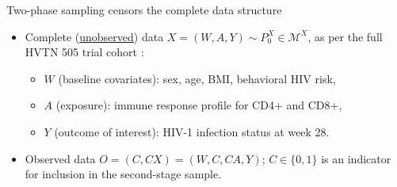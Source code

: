 \documentclass{beamer}
\begin{document}

\begin{frame}[c]{Two-phase sampling censors the complete data structure}

\begin{center}
\begin{itemize}
  \itemsep10pt
  \item Complete (\underline{unobserved}) data $X = (W, A, Y) \sim P_0^X \in
    \mathcal{M}^X$, as per the full HVTN 505 trial cohort
    \citep{hammer2013efficacy}:
    \vspace{1em}
    \begin{itemize}
      \itemsep8pt
      \item $W$ (baseline covariates): sex, age, BMI, behavioral HIV risk,
      \item $A$ (exposure): immune response profile for CD4+ and CD8+,
      \item $Y$ (outcome of interest): HIV-1 infection status at week 28.
    \end{itemize}
  \item Observed data $O = (C, C X) = (W, C, C A, Y)$; $C \in \{0,1\}$ is an
    indicator for inclusion in the second-stage sample.
\end{itemize}
\end{center}


\end{frame}

\end{document}
